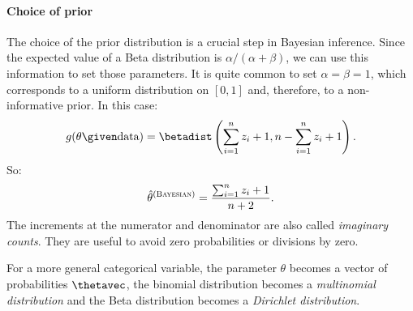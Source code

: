 \paragraph{Choice of prior}

The choice of the prior distribution is a crucial step in Bayesian inference. Since the expected value of a Beta distribution is $\alpha/(\alpha + \beta)$, we can use this information to set those parameters. It is quite common to set $\alpha = \beta = 1$, which corresponds to a uniform distribution on $[0, 1]$ and, therefore, to a non-informative prior. In this case:
\begin{equation}
    g(\theta \given \text{data}) = \betadist\left(\sum_{i = 1}^n z_i + 1, n - \sum_{i = 1}^n z_i + 1\right).
\end{equation}
So:
\begin{equation}
    \hat{\theta}^{(\textsc{Bayesian})} = \frac{\sum_{i = 1}^n z_i + 1}{n + 2}.
\end{equation}
The increments at the numerator and denominator are also called \emph{imaginary counts}. They are useful to avoid zero probabilities or divisions by zero.

For a more general categorical variable, the parameter $\theta$ becomes a vector of probabilities $\thetavec$, the binomial distribution becomes a \emph{multinomial distribution} and the Beta distribution becomes a \emph{Dirichlet distribution}.